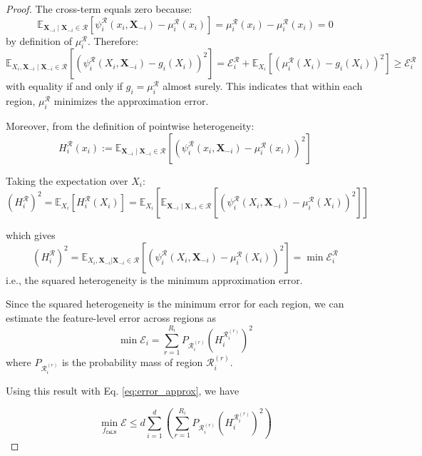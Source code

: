 \begin{proof}
The cross-term equals zero because:
\begin{equation*}
\mathbb{E}_{\mathbf{X}_{-i}\mid \mathbf{X}_{-i} \in \mathcal{R}}\left[\psi_i^{\mathcal{R}}(x_i, \mathbf{X}_{-i}) - \mu^{\mathcal{R}}_i(x_i)\right] = \mu^{\mathcal{R}}_i(x_i) - \mu^{\mathcal{R}}_i(x_i) = 0
\end{equation*}
by definition of $\mu^{\mathcal{R}}_i$. Therefore:
\begin{equation*}
\mathbb{E}_{X_i, \mathbf{X}_{-i}\mid \mathbf{X}_{-i} \in \mathcal{R}}\left[\left(\psi_i^{\mathcal{R}}(X_i, \mathbf{X}_{-i}) - g_i(X_i)\right)^2\right] = \mathcal{E}^{\mathcal{R}}_i + \mathbb{E}_{X_i}\left[\left(\mu^{\mathcal{R}}_i(X_i) - g_i(X_i)\right)^2\right] \geq \mathcal{E}^{\mathcal{R}}_i
\end{equation*}
with equality if and only if $g_i = \mu^{\mathcal{R}}_i$ almost surely. This indicates that within each region, $\mu_i^{\mathcal{R}}$ minimizes the approximation error.

Moreover, from the definition of pointwise heterogeneity:
\begin{equation*}
H^{\mathcal{R}}_i(x_i) := \mathbb{E}_{\mathbf{X}_{-i}\mid \mathbf{X}_{-i} \in \mathcal{R}}\left[\left(\psi_i^{\mathcal{R}}(x_i, \mathbf{X}_{-i}) - \mu^{\mathcal{R}}_i(x_i)\right)^2\right]
\end{equation*}

Taking the expectation over $X_i$:
\begin{equation*}
\left(H^{\mathcal{R}}_i\right)^2 = \mathbb{E}_{X_i}\left[H^{\mathcal{R}}_i(X_i)\right] = \mathbb{E}_{X_i}\left[\mathbb{E}_{\mathbf{X}_{-i}\mid \mathbf{X}_{-i} \in \mathcal{R}}\left[\left(\psi_i^{\mathcal{R}}(X_i, \mathbf{X}_{-i}) - \mu^{\mathcal{R}}_i(X_i)\right)^2\right]\right]
\end{equation*}

which gives
\begin{equation*}
\left(H^{\mathcal{R}}_i\right)^2 = \mathbb{E}_{X_i, \mathbf{X}_{-i}|\mathbf{X}_{-i} \in \mathcal{R}}\left[\left(\psi_i^{\mathcal{R}}(X_i, \mathbf{X}_{-i}) - \mu^{\mathcal{R}}_i(X_i)\right)^2\right] = \min\mathcal{E}_i^{\mathcal{R}}
\end{equation*}
i.e., the squared heterogeneity is the minimum approximation error.

Since the squared heterogeneity is the minimum error for each region, we can estimate the feature-level error across regions as
\begin{equation*}
\min{\mathcal{E}_i} = \sum_{r=1}^{R_i}P_{\mathcal{R}_i^{(r)}}\left(H^{\mathcal{R}_i^{(r)}}_i\right)^2
\end{equation*}
where $P_{\mathcal{R}_i^{(r)}}$ is the probability mass of region $\mathcal{R}_i^{(r)}$.

Using this result with Eq. \eqref{eq:error_approx}, we have

\begin{equation*}
\min_{f_{\texttt{CALM}}} \mathcal{E} \leq d\sum_{i=1}^{d}\left(\sum_{r=1}^{R_i}P_{\mathcal{R}_i^{(r)}}\left(H^{\mathcal{R}_i^{(r)}}_i\right)^2\right)
\end{equation*}

\end{proof}

